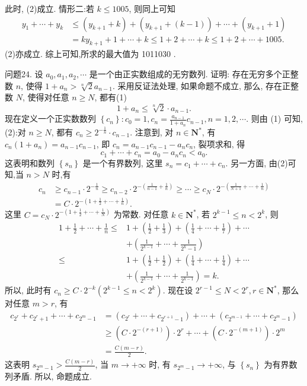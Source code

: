 此时, (2)成立.
情形二:若 $k \leqslant 1005$, 则同上可知
$$
\begin{aligned}
y_1+\cdots+y_k & \leqslant\left(y_{k+1}+k\right)+\left(y_{k+1}+(k-1)\right)+\cdots+\left(y_{k+1}+1\right) \\
& =k y_{k+1}+1+\cdots+k \leqslant 1+2+\cdots+k \leqslant 1+2+\cdots+1005 .
\end{aligned}
$$
(2)亦成立.
综上可知,所求的最大值为 1011030 .



问题24. 设 $a_0, a_1, a_2, \cdots$ 是一个由正实数组成的无穷数列.
证明: 存在无穷多个正整数 $n$, 使得 $1+a_n>\sqrt[n]{2} a_{n-1}$.
采用反证法处理, 如果命题不成立, 那么, 存在正整数 $N$, 使得对任意 $n \geqslant N$, 都有(1)
$$
1+a_n \leqslant \sqrt[n]{2} \cdot a_{n-1} .
$$
现在定义一个正实数数列 $\left\{c_n\right\}: c_0=1, c_n=\frac{a_{n-1}}{1+a_n} c_{n-1}, n=1,2, \cdots$.
则由 (1) 可知, (2):对 $n \geqslant N$, 都有 $c_n \geqslant 2^{-\frac{1}{n}} \cdot c_{n-1}$.
注意到, 对 $n \in \mathbf{N}^*$, 有 $c_n\left(1+a_n\right)=a_{n-1} c_{n-1}$, 即 $c_n=a_{n-1} c_{n-1}-a_n c_n$, 裂项求和, 得
$$
c_1+\cdots+c_n=a_0-a_n c_n<a_0 .
$$
这表明和数列 $\left\{s_n\right\}$ 是一个有界数列, 这里 $s_n=c_1+\cdots+c_n$.
另一方面, 由(2)可知,当 $n>N$ 时,有
$$
\begin{aligned}
c_n & \geqslant c_{n-1} \cdot 2^{-\frac{1}{n}} \geqslant c_{n-2} \cdot 2^{-\left(\frac{1}{n-1}+\frac{1}{n}\right)} \geqslant \cdots \geqslant c_N \cdot 2^{-\left(\frac{1}{N+1}+\cdots+\frac{1}{n}\right)} \\
& =C \cdot 2^{-\left(1+\frac{1}{2}+\cdots+\frac{1}{n}\right)} .
\end{aligned}
$$
这里 $C=c_N \cdot 2^{-\left(1+\frac{1}{2}+\cdots+\frac{1}{N}\right)}$ 为常数.
对任意 $k \in \mathbf{N}^*$, 若 $2^{k-1} \leqslant n<2^k$, 则
$$
\begin{aligned}
1+\frac{1}{2}+\cdots+\frac{1}{n} \leqslant & 1+\left(\frac{1}{2}+\frac{1}{3}\right)+\left(\frac{1}{4}+\cdots+\frac{1}{7}\right)+\cdots \\
& +\left(\frac{1}{2^{k-1}}+\cdots+\frac{1}{2^k-1}\right) \\
\leqslant & 1+\left(\frac{1}{2}+\frac{1}{2}\right)+\left(\frac{1}{4}+\cdots+\frac{1}{4}\right)+\cdots \\
& +\left(\frac{1}{2^{k-1}}+\cdots+\frac{1}{2^{k-1}}\right)=k .
\end{aligned}
$$
所以, 此时有 $c_n \geqslant C \cdot 2^{-k}\left(2^{k-1} \leqslant n<2^k\right)$.
现在设 $2^{r-1} \leqslant N<2^r, r \in \mathbf{N}^*$, 那么对任意 $m>r$, 有
$$
\begin{aligned}
c_{2^r}+c_{2^r+1}+\cdots+c_{2^m-1} & =\left(c_{2^r}+\cdots+c_{2^{r+1}-1}\right)+\cdots+\left(c_{2^{m-1}}+\cdots+c_{2^m-1}\right) \\
& \geqslant\left(C \cdot 2^{-(r+1)}\right) \cdot 2^r+\cdots+\left(C \cdot 2^{-(m+1)}\right) \cdot 2^m \\
& =\frac{C(m-r)}{2} .
\end{aligned}
$$
这表明 $s_{2^m-1}>\frac{C(m-r)}{2}$, 当 $m \rightarrow+\infty$ 时, 有 $s_{2^m-1} \rightarrow+\infty$, 与 $\left\{s_n\right\}$ 为有界数列矛盾.
所以, 命题成立.



